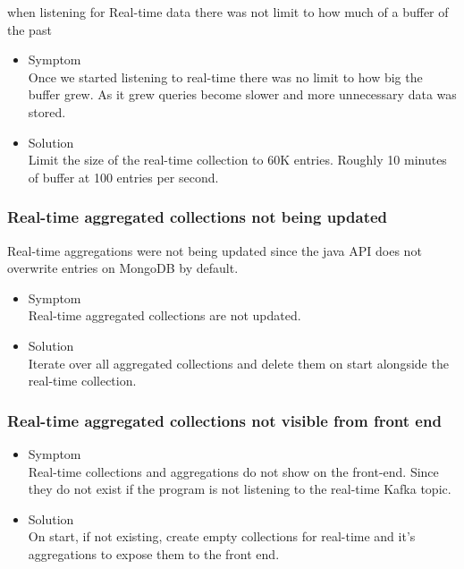 \documentclass[oneside, english, final]{design}
\begin{document}
when listening for Real-time data there was not limit to how much of a buffer of the past

\begin{itemize}
      \item{Symptom
            \\
            Once we started listening to real-time there was no limit to how big the buffer grew. As it grew queries become slower and more unnecessary data was stored.
	}
      \item{Solution
            \\
            Limit the size of the real-time collection to 60K entries. Roughly 10 minutes of buffer at 100 entries per second.
            }
\end{itemize}

\subsubsection{Real-time  aggregated collections not being updated}

Real-time aggregations were not being updated since the java API does not overwrite entries on MongoDB by default.

\begin{itemize}
      \item{Symptom
            \\
            Real-time aggregated collections are not updated.
	}
      \item{Solution
            \\
            Iterate over all aggregated collections and delete them on start alongside the real-time collection.
            }
\end{itemize}

\subsubsection{Real-time  aggregated collections not visible from front end}

\begin{itemize}
      \item{Symptom
            \\
            Real-time collections and aggregations do not show on the front-end. Since they do not exist if the program is not listening to the real-time Kafka topic.
	}
      \item{Solution
            \\
            On start, if not existing, create empty collections for real-time and it's aggregations to expose them to the front end.
            }
\end{itemize}
\end{document}
